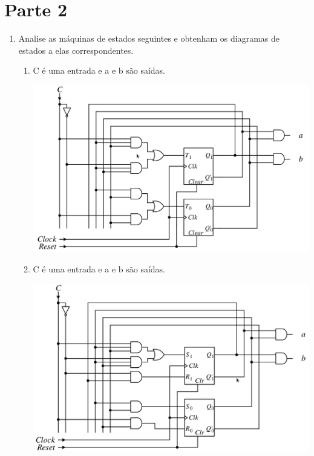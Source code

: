 \documentclass[a4paper,10pt]{article}
\begin{document}
\section{Parte 2}
\begin{enumerate}
 \item Analise as máquinas de estados seguintes e obtenham os diagramas de estados a elas correspondentes. 
  \begin{enumerate}
   \item C é uma entrada e a e b são saídas. \\
    \begin{center}
      \includegraphics[width = 5in]{p1_q1}
    \end{center}
    
    \item C é uma entrada e a e b são saídas. \\
    \begin{center}
      \includegraphics[width = 5in]{p1_q2}
    \end{center}
    

\end{enumerate}
\end{enumerate}
\end{document}

